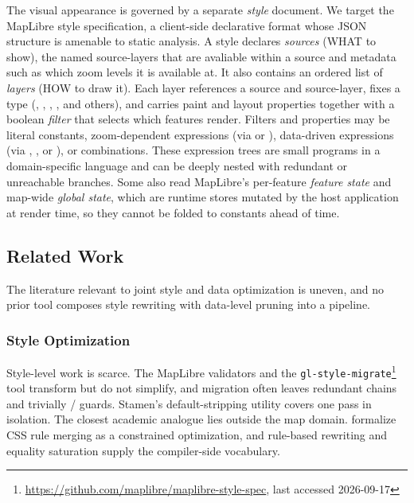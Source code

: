 The visual appearance is governed by a separate \emph{style} document.
We target the MapLibre style specification, a client-side declarative format whose \ac{JSON} structure is amenable to static analysis.
A style declares \emph{sources} (WHAT to show), the named source-layers that are avaliable within a source and metadata such as which zoom levels it is available at.
It also contains an ordered list of \emph{layers} (HOW to draw it).
Each layer references a source and source-layer, fixes a type (, , , , and others), and carries paint and layout properties together with a boolean \emph{filter} that selects which features render.
Filters and properties may be literal constants, zoom-dependent expressions (via  or ), data-driven expressions (via , , or ), or combinations.
These expression trees are small programs in a domain-specific language and can be deeply nested with redundant or unreachable branches.
Some also read MapLibre's per-feature \emph{feature state} and map-wide \emph{global state}, which are runtime stores mutated by the host application at render time, so they cannot be folded to constants ahead of time.

\subsection{Related Work}\label{sec:background_rw}

The literature relevant to joint style and data optimization is uneven, and no prior tool composes style rewriting with data-level pruning into a pipeline.

\subsubsection{Style Optimization}
Style-level work is scarce.
The MapLibre validators and the \texttt{gl-style-migrate}\footnote{\url{https://github.com/maplibre/maplibre-style-spec}, last accessed 2026-09-17} tool transform but do not simplify, and migration often leaves redundant  chains and trivially / guards.
Stamen's default-stripping utility covers one pass in isolation.
The closest academic analogue lies outside the map domain.
\citet{hagueCSSMinificationConstraint2019} formalize CSS rule merging as a constrained optimization, and rule-based rewriting \citep{piraheshExtensibleRuleBased1992} and equality saturation \citep{tateEqualitySaturationNew2009,willseyEggFastExtensible2021} supply the compiler-side vocabulary.

